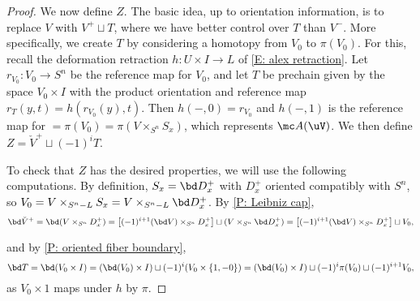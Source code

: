 \begin{example}
\begin{proof}
	We now define $Z$. The basic idea, up to orientation information, is to replace $V$ with $V^+ \sqcup T$, where we have better control over $T$ than $V^-$.
	More specifically, we create $T$ by considering a homotopy from $V_0$ to $\pi(V_0)$.
	For this, recall the deformation retraction $h \colon U \times I \to L$ of \eqref{E: alex retraction}.
	Let $r_{V_0} \colon V_0 \to S^n$ be the reference map for $V_0$, and let $T$ be prechain given by the space $V_0 \times I$ with the product orientation and reference map $r_T(y,t) = h(r_{V_0}(y),t)$.
	Then $h(-,0) = r_{V_0}$ and $h(-,1)$ is the reference map for $= \pi(V_0) = \pi(V \times_{S^n} S_x)$, which represents $\mc A(\uV)$.
	We then define $Z = \check V^+ \sqcup (-1)^i T$.
	\begin{comment}
	In particular, by \cref{D: PC products,L: W0 cochain},  $\check V^+ = V \times_{S^n-L} D_x^+$,\footnote{Note that, before taking the induced orientation for the cap product, we have $V \times_{S^n-L} M_x = M_x \times_{S^n-L} V$ as fiber products of precochains by the commutativity formula, so this agrees with the definition of $V^+$ in \cref{S: splitting}.} and this is the same as first taking the induced orientation and then restricting to the space $V^+$ DOUBLE CHECK.
	\end{comment}

	To check that $Z$ has the desired properties, we will use the following computations.
	By definition, $S_x = \bd D_x^+$ with $D_x^+$ oriented compatibly with $S^n$,
	so $V_0 =  V \times_{S^n-L} S_x = V \times_{S^n-L} \bd D_x^+$.
	By \cref{P: Leibniz cap}, $$\bd \check V^+ = \bd(V \times_{S^n} D_x^+) = \left[(-1)^{i+1} (\bd V) \times_{S^n} D_x^+\right] \sqcup (V \times_{S^n} \bd D_x^+) = \left[(-1)^{i+1} (\bd V) \times_{S^n} D_x^+\right] \sqcup V_0,$$
	\begin{comment}Similarly,  $$\bd \check V^+ = \bd(V \times_{S^n} M_x) = \left[(-1)^{i+1} (\bd V) \times_{S^n} D_x\right] \sqcup (V \times_{S^n} \bd M_x)=(-1)^{i+1} ((\bd V)^+)^\vee \sqcup -V_0.$$
	\end{comment}
	and by \cref{P: oriented fiber boundary},
	\begin{equation}\label{E: alex cylinder bdry}
	\bd T = \bd (V_0 \times I) = (\bd (V_0) \times I) \sqcup (-1)^{i} (V_0 \times \{1,-0\}) =  (\bd (V_0) \times I) \sqcup (-1)^i\pi(V_0)\sqcup (-1)^{i+1} V_0,
	\end{equation}
	as $V_0 \times 1$ maps under $h$ by $\pi$.

	\begin{comment}
	DO I NEED THIS:::
	So, $V_0 = V \times_{S^n} \bd D_x$ represents the same chain as $$\bd(V \times_{S^n} D_x) \sqcup (-1)^{i+1} (\bd V) \times_{S^n} D_x = \bd \check  V^- \sqcup (-1)^{i+1} (\bd V) \times_{S^n} D_x.$$
	In particular, the orientation of $V_0$ is the same as the orientation of $\bd \check  V^-$.
	\end{comment}




\end{proof}
\end{example}
